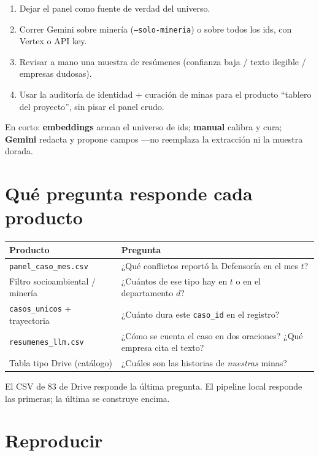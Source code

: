 \documentclass[11pt,a4paper]{article}
\begin{document}
\begin{enumerate}
  \item Dejar el panel como fuente de verdad del universo.
  \item Correr Gemini sobre minería (\texttt{--solo-mineria}) o sobre todos los ids, con Vertex o API key.
  \item Revisar a mano una muestra de resúmenes (confianza baja / texto ilegible / empresas dudosas).
  \item Usar la auditoría de identidad + curación de minas para el producto ``tablero del proyecto'', sin pisar el panel crudo.
\end{enumerate}

En corto: \textbf{embeddings} arman el universo de ids; \textbf{manual} calibra y cura; \textbf{Gemini} redacta y propone campos ---no reemplaza la extracción ni la muestra dorada.

\section{Qué pregunta responde cada producto}

\begin{center}
\renewcommand{\arraystretch}{1.15}
\begin{tabularx}{\textwidth}{@{}l Y@{}}
\toprule
\textbf{Producto} & \textbf{Pregunta} \\
\midrule
\texttt{panel\_caso\_mes.csv} & ¿Qué conflictos reportó la Defensoría en el mes $t$? \\
Filtro socioambiental / minería & ¿Cuántos de ese tipo hay en $t$ o en el departamento $d$? \\
\texttt{casos\_unicos} + trayectoria & ¿Cuánto dura este \texttt{caso\_id} en el registro? \\
\texttt{resumenes\_llm.csv} & ¿Cómo se cuenta el caso en dos oraciones? ¿Qué empresa cita el texto? \\
Tabla tipo Drive (catálogo) & ¿Cuáles son las historias de \emph{nuestras} minas? \\
\bottomrule
\end{tabularx}
\end{center}

El CSV de 83 de Drive responde la última pregunta. El pipeline local responde las primeras; la última se construye encima.

\section{Reproducir}
\end{document}
